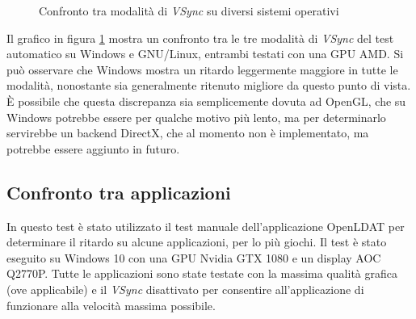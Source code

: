 \begin{figure}[h!]
	\centering
	\dataset
	\caption{Confronto tra modalità di \textit{VSync} su diversi sistemi operativi}
	\label{fig:inputlag_vsyncmodes}
\end{figure}

Il grafico in figura \ref{fig:inputlag_vsyncmodes} mostra un confronto tra le tre modalità di \textit{VSync} del test automatico su Windows e GNU/Linux, entrambi testati con una GPU AMD. Si può osservare che Windows mostra un ritardo leggermente maggiore in tutte le modalità, nonostante sia generalmente ritenuto migliore da questo punto di vista. È possibile che questa discrepanza sia semplicemente dovuta ad OpenGL, che su Windows potrebbe essere per qualche motivo più lento, ma per determinarlo servirebbe un backend DirectX, che al momento non è implementato, ma potrebbe essere aggiunto in futuro.

\subsection{Confronto tra applicazioni}
In questo test è stato utilizzato il test manuale dell'applicazione OpenLDAT per determinare il ritardo su alcune applicazioni, per lo più giochi. Il test è stato eseguito su Windows 10 con una GPU Nvidia GTX 1080 e un display AOC Q2770P. Tutte le applicazioni sono state testate con la massima qualità grafica (ove applicabile) e il \textit{VSync} disattivato per consentire all'applicazione di funzionare alla velocità massima possibile.

